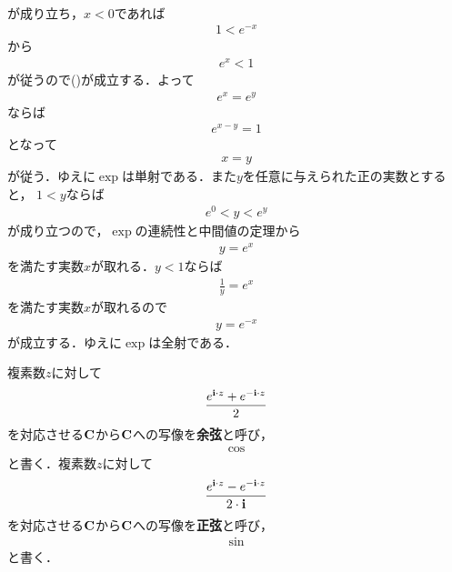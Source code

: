 \begin{sketch}
\begin{align}
		\end{align}
		が成り立ち，$x < 0$であれば
		\begin{align}
			1 < e^{-x}
		\end{align}
		から
		\begin{align}
			e^{x} < 1
		\end{align}
		が従うので()が成立する．よって
		\begin{align}
			e^x = e^y
		\end{align}
		ならば
		\begin{align}
			e^{x - y} = 1
		\end{align}
		となって
		\begin{align}
			x = y
		\end{align}
		が従う．ゆえに$\exp$は単射である．また$y$を任意に与えられた正の実数とすると，
		$1 < y$ならば
		\begin{align}
			e^{0} < y < e^{y}
		\end{align}
		が成り立つので，$\exp$の連続性と中間値の定理から
		\begin{align}
			y = e^{x}
		\end{align}
		を満たす実数$x$が取れる．$y < 1$ならば
		\begin{align}
			\frac{1}{y} = e^{x}
		\end{align}
		を満たす実数$x$が取れるので
		\begin{align}
			y = e^{-x}
		\end{align}
		が成立する．ゆえに$\exp$は全射である．
		\QED
	\end{sketch}
	
	\begin{screen}
		\begin{dfn}[三角関数]
			複素数$z$に対して
			\begin{align}
				\frac{e^{\mathbf{i} \cdot z} + e^{-\mathbf{i} \cdot z}}{2}
			\end{align}
			を対応させる$\mathbf{C}$から$\mathbf{C}$への写像を{\bf 余弦}と呼び，
			\begin{align}
				\cos
			\end{align}
			と書く．複素数$z$に対して
			\begin{align}
				\frac{e^{\mathbf{i} \cdot z} - e^{-\mathbf{i} \cdot z}}{2 \cdot \mathbf{i}}
			\end{align}
			を対応させる$\mathbf{C}$から$\mathbf{C}$への写像を{\bf 正弦}と呼び，
			\begin{align}
				\sin
			\end{align}
			と書く．
		\end{dfn}
	\end{screen}
	
